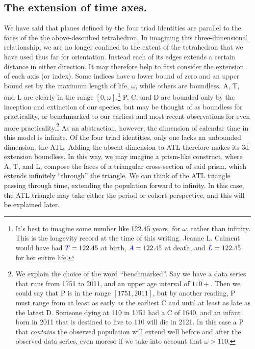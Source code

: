 \documentclass[11pt,oneside]{article} %
\newcommand\eg[1]{\textcolor{bl}{#1}}
\begin{document}
\subsection*{The extension of time axes.}
We have said that planes defined by the four triad identities are parallel to
the faces of the the above-described tetrahedron. In imagining this three-dimensional
relationship, we are no longer confined to the extent of the tetrahedron that
we have used thus far for orientation. Instead each of its edges extends a
certain distance in either direction.
It may therefore help to first consider the extension of each axis (or index).
Some indices have a lower bound of zero and an upper bound set by the maximum
length of life, $\omega$, while others are boundless. \eg{A}, \eg{T}, and \eg{L}
are clearly in the range $[0,\omega]$.\footnote{It's best to imagine some number like 122.45 years, for $\omega$, rather than infinity. This is the longevity record at the time of this writing. Jeanne L. Calment would have had
$\eg{T}=122.45$ at birth, $\eg{A} = 122.45$ at death, and $\eg{L}=122.45$ for
her entire life.} \eg{P}, \eg{C}, and \eg{D} are bounded only by the inception and extinction of
our species, but may be thought of as boundless for practicality, or benchmarked
to our earliest and most recent observations for even more
practicality.\footnote{We explain the choice of the word ``benchmarked''. Say
we have a data series that runs from 1751 to 2011, and an upper age
interval of $110+$. Then we could say that \eg{P} is in the range $[1751,2011]$,
but by another reading, \eg{P} must range from at least as early as the earliest
\eg{C} and until at least as late as the latest \eg{D}. Someone dying at 110 in 1751
had a \eg{C} of 1640, and an infant born in 2011 that is destined to live to 110
will die in 2121. In this case a \eg{P} that \textit{contains} the observed
population will extend well before and after the observed data series, even
moreso if we take into account that $\omega > 110$.} As an abstraction,
however, the dimension of calendar time in this model is infinite. Of the four
triad identities, only one lacks an unbounded dimension, the \eg{ATL}. Adding
the absent dimension to \eg{ATL} therefore makes its 3d extension boundless. In
this way, we may imagine a prism-like construct, where \eg{A}, \eg{T}, and \eg{L}, compose
the faces of a triangular cross-section of said prism, which extends infinitely ``through'' the triangle.
We can think of the \eg{ATL} triangle passing through time, extending the population
forward to infinity. In this case, the \eg{ATL} triangle may take either the period
or cohort perspective, and this will be explained later. 
\end{document}
